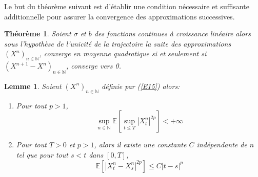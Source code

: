 \documentclass[A4paper,12pt]{report}
\newtheorem{theorem}{Th\'eor\`eme}[chapter]
\newtheorem{lemma}{Lemme}[chapter]
\newcommand{\N}{{\mathbb{N}}}
\newcommand{\E}{{\mathbb{E}}}
\begin{document}
Le but du théorème suivant est d'établir une condition nécessaire et suffisante additionnelle pour assurer la convergence des approximations successives.
\begin{theorem}\label{thm4}
Soient $\sigma$ et $b$ des fonctions continues à croissance linéaire alors sous l'hypothèse de l'unicité de la trajectoire la suite des approximations $(X^n)_{n \in \N}$, converge en moyenne quadratique si et seulement si $(X^{n+1} - X^n)_{n \in \N}$, converge vers 0.
\end{theorem}
\begin{lemma}\label{lem4}
Soient $(X^n)_{n \in \N}$ définie par (\ref{E15}) alors:
\begin{enumerate}
\item Pour tout $p>1$,  $$\sup_{n\in \N} \E\left[ \sup_{t\leq T}\left|X_{t}^{n}\right|^{2 p}\right]<+\infty$$ 
\item Pour tout $T>0$ et $p>1$, alors il existe une constante $C$ indépendante de $n$ tel que pour tout $s<t$ dans $[0, T]$, 
$$\E\left[\left|X_{t}^{n}-X_{s}^{n}\right|^{2 p}\right] \leq C|t-s|^{p}$$
\end{enumerate}
\end{lemma}
\end{document}
